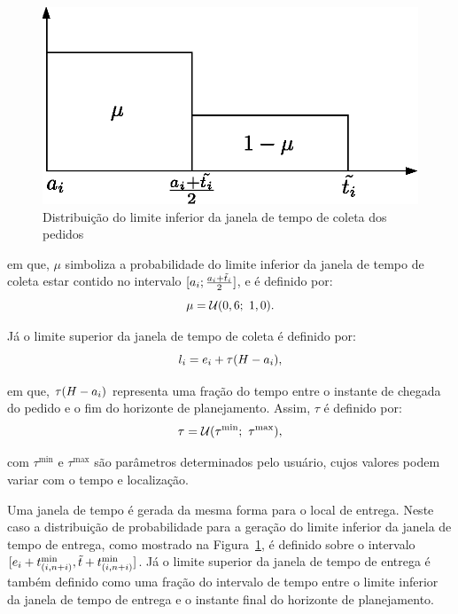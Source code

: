 \begin{figure}[h]
    \centering
    \includegraphics{fig/gendreau2006_distribution.eps}
    \caption{Distribuição do limite inferior da janela de tempo de coleta dos
             pedidos \cite{gendreau_neighborhood_2006}}
    \label{fig:gendreau2006_distribution}
\end{figure}

\noindent em que, $\mu$ simboliza a probabilidade do limite inferior da janela 
de tempo de coleta estar contido no intervalo $[a_i; 
\frac{a_i + \Tilde{t}_i}{2}]$, e é definido por:
%
\begin{equation}
  \mu = \mathcal{U}(0,6;\ 1,0).
\end{equation}

Já o limite superior da janela de tempo de coleta é definido por:
%
\begin{equation}
    l_i = 
      e_i 
      + \tau(H - a_i),
\end{equation}

\noindent em que, $\tau(H - a_i)$ 
representa uma fração do tempo entre o instante de chegada do pedido e o fim 
do horizonte de planejamento. Assim, $\tau$ é definido por:
%
\begin{equation}
  \tau = \mathcal{U}(\tau^{\min};\ \tau^{\max}),
\end{equation}

\noindent com $\tau^{\min}$ e $\tau^{\max}$ são parâmetros determinados pelo 
usuário, cujos valores podem variar com o tempo e localização.

Uma janela de tempo é gerada da mesma forma para o local de entrega. 
Neste caso a distribuição de probabilidade para a geração do limite inferior 
da janela de tempo de entrega, como mostrado na 
Figura~\ref{fig:gendreau2006_distribution}, é definido sobre o intervalo
$[e_i 
+ t_{(i,n + i)}^{\min}, 
\Tilde{t} + t_{(i,n + i)}^{\min}]$.
Já o limite superior da janela de tempo de entrega é também definido como uma
fração do intervalo de tempo entre o limite inferior da janela de tempo de
entrega e o instante final do horizonte de planejamento.

